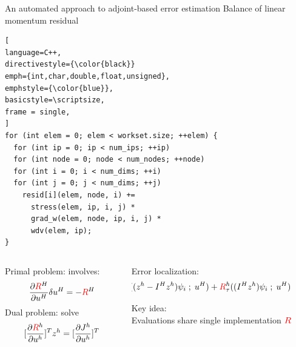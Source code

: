 \documentclass[fleqn]{beamer}
\begin{document}
\begin{frame}[containsverbatim]{An automated approach to adjoint-based error estimation}
{Balance of linear momentum residual}

\begin{lstlisting}[
language=C++,
directivestyle={\color{black}}
emph={int,char,double,float,unsigned},
emphstyle={\color{blue}},
basicstyle=\scriptsize,
frame = single,
]
for (int elem = 0; elem < workset.size; ++elem) {
  for (int ip = 0; ip < num_ips; ++ip)
  for (int node = 0; node < num_nodes; ++node)
  for (int i = 0; i < num_dims; ++i)
  for (int j = 0; j < num_dims; ++j)
    resid[i](elem, node, i) +=
      stress(elem, ip, i, j) *
      grad_w(elem, node, ip, i, j) *
      wdv(elem, ip);
}
\end{lstlisting}

\scriptsize
\begin{columns}
\begin{column}{0.5\textwidth}
Primal problem: involves:
\[
\frac{\partial {\color{red}R} ^H}{\partial u^H} \delta u^H= 
- {\color{red}R} ^H
\]
Dual problem: solve
\[
[ \frac{\partial {\color{red}R} ^h}{\partial u^h} ]^T z^h =
[\frac{\partial J^h}{\partial u^h} ]^T
\]
\end{column}
\begin{column}{0.5\textwidth}
Error localization:
\[
\hspace*{-6em}
\mathcal{E}_i = {\color{red}R}_g^h((z^h - I^H z^h) \psi_i \; ; \; u^H)
+ {\color{red}R}_{\tau}^h((I^H z^h) \psi_i \; ; \; u^H)
\]

\vspace{1em}

Key idea: \\
Evaluations share single implementation ${\color{red} R}$
\end{column}
\end{columns}

\end{frame}

\end{document}
